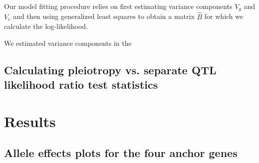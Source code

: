 \documentclass{article}
\begin{document}
Our model fitting procedure relies on first estimating variance components $V_g$ and $V_e$ and then using generalized least squares to obtain a matrix $\hat B$ for which we calculate the log-likelihood.



We estimated variance components in the 








\subsection{Calculating pleiotropy vs. separate QTL likelihood ratio test statistics}
















\section{Results}

\subsection{Allele effects plots for the four anchor genes}
\end{document}
